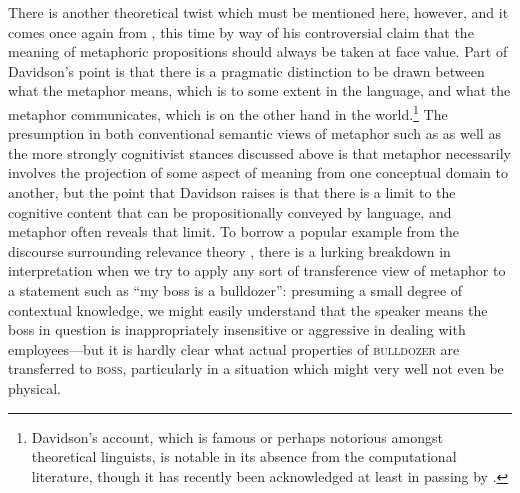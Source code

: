 There is another theoretical twist which must be mentioned here, however, and it comes once again from \cite{Davidson1978}, this time by way of his controversial claim that the meaning of metaphoric propositions should always be taken at face value.  Part of Davidson's point is that there is a pragmatic distinction to be drawn between what the metaphor means, which is to some extent in the language, and what the metaphor communicates, which is on the other hand in the world.\footnote{Davidson's account, which is famous or perhaps notorious amongst theoretical linguists, is notable in its absence from the computational literature, though it has recently been acknowledged at least in passing by \cite{Veale2016}.}  The presumption in both conventional semantic views of metaphor such as  as well as the more strongly cognitivist stances discussed above is that metaphor necessarily involves the projection of some aspect of meaning from one conceptual domain to another, but the point that Davidson raises is that there is a limit to the cognitive content that can be propositionally conveyed by language, and metaphor often reveals that limit.  To borrow a popular example from the discourse surrounding relevance theory \citep[][for example]{GibbsEA2006,Carston2012}, there is a lurking breakdown in interpretation when we try to apply any sort of transference view of metaphor to a statement such as ``my boss is a bulldozer'': presuming a small degree of contextual knowledge, we might easily understand that the speaker means the boss in question is inappropriately insensitive or aggressive in dealing with employees---but it is hardly clear what actual properties of \textsc{bulldozer} are transferred to \textsc{boss}, particularly in a situation which might very well not even be physical.

